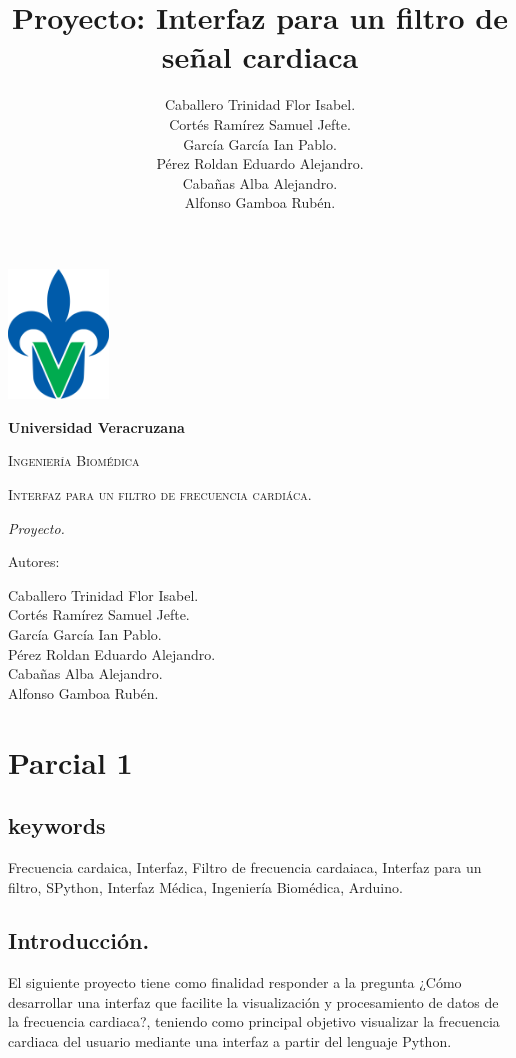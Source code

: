 \documentclass{report}
\title{Proyecto: Interfaz para un filtro de señal cardiaca}
\author{Caballero Trinidad Flor Isabel. \\ Cortés Ramírez Samuel Jefte. \\ García García Ian Pablo. \\ Pérez Roldan Eduardo Alejandro. \\ Cabañas Alba Alejandro. \\ Alfonso Gamboa Rubén.}
\begin{document}
\begin{titlepage}
	\centering
	{\includegraphics[width=0.2\textwidth]{recursos/Universidad_Veracruzana}\par}
	\vspace{1cm}
	{\bfseries\LARGE Universidad Veracruzana \par}
	\vspace{1cm}
	{\scshape\Large Ingeniería Biomédica \par}
	\vspace{3cm}
	{\scshape\Huge Interfaz para un filtro de frecuencia cardiáca. \par}
	\vspace{2cm}
	{\itshape\Large Proyecto. \par}
	\vfill
	{\Large Autores: \par}
	{\Large Caballero Trinidad Flor Isabel. \\ Cortés Ramírez Samuel Jefte. \\ García García Ian Pablo. \\ Pérez Roldan Eduardo Alejandro. \\ Cabañas Alba Alejandro. \\ Alfonso Gamboa Rubén. \par}
	\vfill
	
\end{titlepage}

\chapter{Parcial 1}
	\section{keywords}
	Frecuencia cardaica, Interfaz, Filtro de frecuencia cardaiaca, Interfaz para un filtro, SPython, Interfaz Médica, Ingeniería Biomédica, Arduino.
	
	\section{Introducción.}
		El siguiente proyecto tiene como finalidad responder a la pregunta ¿Cómo desarrollar una interfaz que facilite la visualización y procesamiento de datos de la frecuencia cardiaca?, teniendo como principal objetivo visualizar la frecuencia cardiaca del usuario mediante una interfaz a partir del lenguaje Python. 
		
\end{document}
